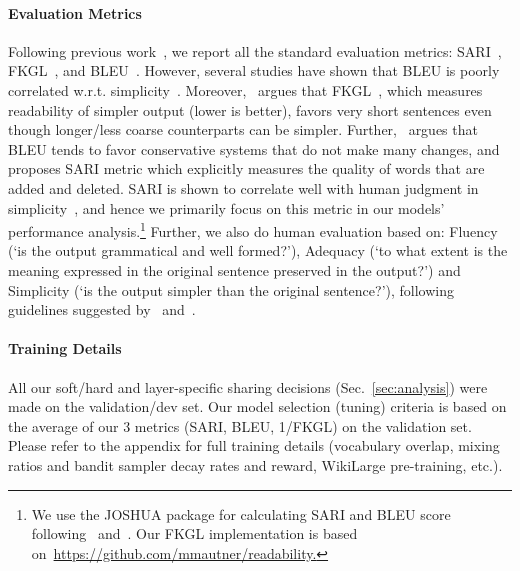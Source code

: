 \documentclass[11pt]{article}
\def\secref#1{Sec.~\ref{#1}}
\begin{document}
\paragraph{Evaluation Metrics}
\label{subsec:evaluation}

Following previous work~\cite{zhang2017dress}, we report all the standard evaluation metrics: SARI~\cite{Xu2016OptimizingSM}, FKGL~\cite{kincaid1975fkgl}, and BLEU~\cite{Papineni2002BleuAM}. However, several studies have shown that BLEU is poorly correlated w.r.t. simplicity~\cite{Zhu2010AMT,vstajner2015deeper,Xu2016OptimizingSM}. Moreover,~ argues that FKGL~\cite{kincaid1975fkgl}, which measures readability of simpler output (lower is better), favors very short sentences even though longer/less coarse counterparts can be simpler. Further,~ argues that BLEU tends to favor conservative systems that do not make many changes, and proposes SARI metric which explicitly measures the quality of words that are added and deleted.
SARI is shown to correlate well with human judgment in simplicity~\cite{Xu2016OptimizingSM},
and hence we primarily focus on this metric in our models' performance analysis.\footnote{We use the JOSHUA package for calculating SARI and BLEU score following~ and~. Our FKGL implementation is based on~\url{https://github.com/mmautner/readability.}} 
Further, we also do human evaluation based on: Fluency (`is the output grammatical and well formed?'), Adequacy (`to what extent is the meaning expressed in the original sentence preserved in the output?') and Simplicity (`is the output simpler than the original sentence?'), following guidelines suggested by~ and~.

\paragraph{Training Details}
\label{subsec:training}
All our soft/hard and layer-specific sharing decisions (\secref{sec:analysis}) were made on the validation/dev set. Our model selection (tuning) criteria is based on the average of our 3 metrics (SARI, BLEU, 1/FKGL) on the validation set. Please refer to the appendix for full training details (vocabulary overlap, mixing ratios and bandit sampler decay rates and reward, WikiLarge pre-training, etc.).
\end{document}

